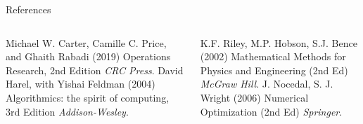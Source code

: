 \documentclass[c]{beamer}
\begin{document}
\begin{frame}{References}
\footnotesize
\begin{thebibliography}{99} %
  \begin{columns}[t]
    \begin{column}{.45\textwidth}
       Michael W. Carter, Camille C. Price, and Ghaith Rabadi (2019)
        \newblock Operations Research, 2nd Edition
        \newblock \emph{CRC Press}.
         David Harel, with Yishai Feldman (2004)
          \newblock Algorithmics: the spirit of computing, 3rd Edition
          \newblock \emph{Addison-Wesley}.
    \end{column}
    \begin{column}{.45\textwidth}
       K.F. Riley, M.P. Hobson, S.J. Bence (2002)
        \newblock Mathematical Methods for Physics and Engineering (2nd Ed)
        \newblock \emph{McGraw Hill}.
       J. Nocedal, S. J. Wright (2006)
        \newblock Numerical Optimization (2nd Ed)
        \newblock \emph{Springer}.
    \end{column}
  \end{columns}
\end{thebibliography}
\end{frame}
\end{document}
